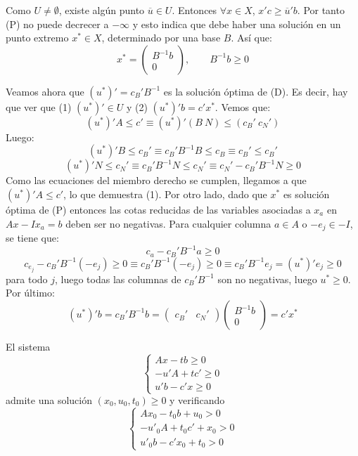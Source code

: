 \documentclass[PM.tex]{subfiles}
\begin{document}
\begin{dem}
Como $U \neq \emptyset$, existe algún punto $\overline{u} \in U$. Entonces $\forall x \in X$, $x'c ≥ \overline{u}'b$. Por tanto (P) no puede decrecer a $-\infty$ y esto indica que debe haber una solución en un punto extremo $x^* \in X$, determinado por una base $B$. Así que:
\[ x^* = \begin{pmatrix}B^{-1} b \\ 0\end{pmatrix}, \qquad B^{-1}b ≥ 0 \]

Veamos ahora que $(u^*)' = c_B'B^{-1}$ es la solución óptima de (D). Es decir, hay que ver que (1) $(u^*)' \in U$ y (2) $(u^*)'b = c'x^*$. Vemos que:
\[ (u^*)'A ≤ c' \equiv (u^*)' (B \ N) ≤ (c_B' \ c_N') \]
Luego:
\[ (u^*)'B ≤ c_B' \equiv c_B'B^{-1}B ≤ c_B \equiv c_B' ≤ c_B'\]
\[ (u^*)'N ≤ c_N' \equiv c_B'B^{-1}N ≤ c_N' \equiv c_N' - c_B'B^{-1}N ≥ 0\]
Como las ecuaciones del miembro derecho se cumplen, llegamos a que $(u^*)'A ≤ c'$, lo que demuestra (1). Por otro lado, dado que $x^*$ es solución óptima de (P) entonces las cotas reducidas de las variables asociadas a $x_a$ en $Ax - I x_a = b$ deben ser no negativas. Para cualquier columna $a \in A$ o $-e_j \in -I$, se tiene que:
\[ c_a - c_B' B^{-1} a ≥ 0 \]
\[ c_{e_j} - c_B' B^{-1}(-e_j) ≥ 0 \equiv  c_B'B^{-1}(-e_j) ≥ 0 \equiv c_B'B^{-1}e_j = (u^*)'e_j ≥ 0 \]
para todo $j$, luego todas las columnas de $c_B'B^{-1}$ son no negativas, luego $u^* ≥ 0$. Por último:
\[ (u^*)'b = c_B'B^{-1}b = \begin{pmatrix}c_B' & c_N'\end{pmatrix}\begin{pmatrix}B^{-1}b\\0\end{pmatrix} = c'x^* \]
\end{dem}

\begin{lema}
El sistema
\begin{equation*}\label{sistema1}\begin{cases}
	Ax - tb ≥ 0\\
	-u'A + tc' ≥ 0\\
	u'b - c'x ≥ 0
\end{cases}\end{equation*}
admite una solución $(x_0,u_0,t_0) ≥ 0$ y verificando
\begin{equation*}\label{sistema2}\begin{cases}
	Ax_0 - t_0b +u_0     > 0\\
	-u'_0A + t_0c' + x_0  > 0\\
	u'_0b - c'x_0 + t_0 > 0
\end{cases}\end{equation*}
\end{lema}
\end{document}
